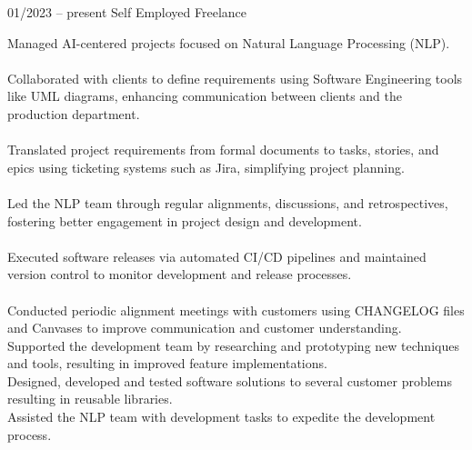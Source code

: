\documentclass[9pt, green]{template/developercv} %
\begin{document}
{\begin{entrylist}
	\entry
{01/2023 -- present }
{}
{Self Employed \space\cpipe\space Freelance}
{
	\vspace{0.3mm}
	\begin{minipage}[t]{0.75\textwidth}				
		\vspace{-\baselineskip}
		\itemmarker Managed AI-centered projects focused on Natural Language Processing (NLP).\\
		\vspace{-3mm}\\
		\itemmarker Collaborated with clients to define requirements using Software Engineering tools like UML diagrams, enhancing communication between clients and the production department.\\
		\vspace{-3mm}\\
		\itemmarker Translated project requirements from formal documents to tasks, stories, and epics using ticketing systems such as Jira, simplifying project planning.\\
		\vspace{-3mm}\\
		\itemmarker Led the NLP team through regular alignments, discussions, and retrospectives, fostering better engagement in project design and development.\\
		\vspace{-3mm}\\
		\itemmarker Executed software releases via automated CI/CD pipelines and maintained version control to monitor development and release processes.\\
        \vspace{-3mm}\\
		\itemmarker Conducted periodic alignment meetings with customers using CHANGELOG files and Canvases to improve communication and customer understanding.\\
		\itemmarker Supported the development team by researching and prototyping new techniques and tools, resulting in improved feature implementations.\\
		\itemmarker Designed, developed and tested software solutions to several customer problems resulting in reusable libraries.\\
		\itemmarker Assisted the NLP team with development tasks to expedite the development process.\\	
\vspace{-3mm}\\  
	\end{minipage}
	
}
\end{entrylist}}
\end{document}
